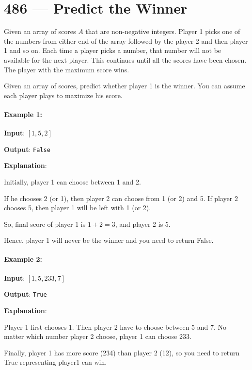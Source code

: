 \section{486 --- Predict the Winner}
Given an array of scores $A$ that are non-negative integers. Player 1 picks one of the numbers from either end of the array followed by the player 2 and then player 1 and so on. Each time a player picks a number, that number will not be available for the next player. This continues until all the scores have been chosen. The player with the maximum score wins.

Given an array of scores, predict whether player 1 is the winner. You can assume each player plays to maximize his score.

\paragraph{Example 1:}

\begin{flushleft}
\textbf{Input}: $[1, 5, 2]$

\textbf{Output}: \texttt{False}

\textbf{Explanation}: 

Initially, player 1 can choose between 1 and 2. 

If he chooses 2 (or 1), then player 2 can choose from 1 (or 2) and 5. If player 2 chooses 5, then player 1 will be left with 1 (or 2). 

So, final score of player 1 is $1 + 2 = 3$, and player 2 is 5. 

Hence, player 1 will never be the winner and you need to return False.

\end{flushleft}

\paragraph{Example 2:}

\begin{flushleft}
\textbf{Input}: $[1, 5, 233, 7]$

\textbf{Output}: \texttt{True}

\textbf{Explanation}: 

Player 1 first chooses 1. Then player 2 have to choose between 5 and 7. No matter which number player 2 choose, player 1 can choose 233.

Finally, player 1 has more score (234) than player 2 (12), so you need to return True representing player1 can win.

\end{flushleft}

